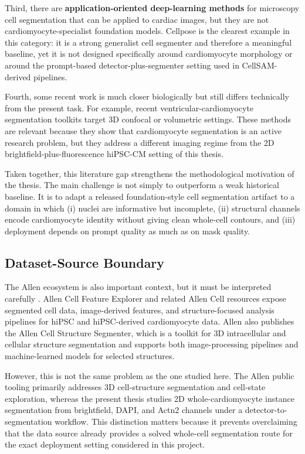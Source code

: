 Third, there are \textbf{application-oriented deep-learning methods} for microscopy cell segmentation that can be applied to cardiac images, but they are not cardiomyocyte-specialist foundation models. Cellpose is the clearest example in this category: it is a strong generalist cell segmenter and therefore a meaningful baseline, yet it is not designed specifically around cardiomyocyte morphology or around the prompt-based detector-plus-segmenter setting used in CellSAM-derived pipelines.

Fourth, some recent work is much closer biologically but still differs technically from the present task. For example, recent ventricular-cardiomyocyte segmentation toolkits target 3D confocal or volumetric settings. These methods are relevant because they show that cardiomyocyte segmentation is an active research problem, but they address a different imaging regime from the 2D brightfield-plus-fluorescence hiPSC-CM setting of this thesis.

Taken together, this literature gap strengthens the methodological motivation of the thesis. The main challenge is not simply to outperform a weak historical baseline. It is to adapt a released foundation-style cell segmentation artifact to a domain in which (i) nuclei are informative but incomplete, (ii) structural channels encode cardiomyocyte identity without giving clean whole-cell contours, and (iii) deployment depends on prompt quality as much as on mask quality.

\subsection{Dataset-Source Boundary}\label{dataset-source-boundary}

The Allen ecosystem is also important context, but it must be interpreted carefully \cite{rafelski2024allen}. Allen Cell Feature Explorer and related Allen Cell resources expose segmented cell data, image-derived features, and structure-focused analysis pipelines for hiPSC and hiPSC-derived cardiomyocyte data. Allen also publishes the Allen Cell Structure Segmenter, which is a toolkit for 3D intracellular and cellular structure segmentation and supports both image-processing pipelines and machine-learned models for selected structures.

However, this is not the same problem as the one studied here. The Allen public tooling primarily addresses 3D cell-structure segmentation and cell-state exploration, whereas the present thesis studies 2D whole-cardiomyocyte instance segmentation from brightfield, DAPI, and Actn2 channels under a detector-to-segmentation workflow. This distinction matters because it prevents overclaiming that the data source already provides a solved whole-cell segmentation route for the exact deployment setting considered in this project.


